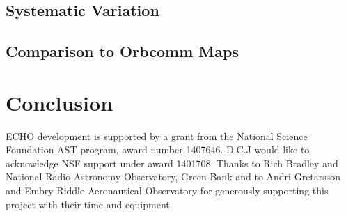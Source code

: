 \documentclass[preprint2,numberedappendix,tighten,twocolappendix]{aastex6}
\begin{document}
\subsection{Systematic Variation}

\subsection{Comparison to Orbcomm Maps}





\section{Conclusion}


\acknowledgments
ECHO development is supported by a grant from the National Science Foundation AST program, award number 1407646. D.C.J would like to acknowledge NSF support  under award 1401708.
Thanks to Rich Bradley and National Radio Astronomy Observatory, Green Bank and to Andri Gretarsson and Embry Riddle Aeronautical Observatory for generously supporting this project with their time and equipment.



\end{document}
